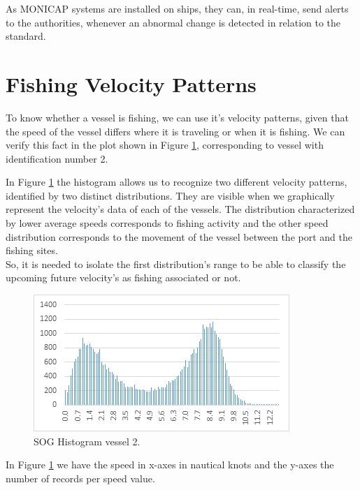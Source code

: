 As MONICAP systems are installed on ships, they can, in real-time, send alerts to the authorities, whenever an abnormal change is detected in relation to the standard.


\section{Fishing Velocity Patterns} %
\label{sub:fishing_velocity_patterns}
To know whether a vessel is fishing, we can use it’s velocity patterns, given that the speed of the vessel differs where it is traveling or when it is fishing. We can verify this fact in the plot shown in Figure \ref{fig:histogram_vessel2}, corresponding to vessel with identification number 2.

In Figure \ref{fig:histogram_vessel2} the histogram allows us to recognize two different velocity patterns, identified by two distinct distributions. They are visible when we graphically represent the velocity’s data of each of the vessels. The distribution characterized by lower average speeds corresponds to fishing activity and the other speed distribution corresponds to the movement of the vessel between the port and the fishing sites.\\
So, it is needed to isolate the first distribution’s range to be able to classify the upcoming future velocity’s as fishing associated or not.
 
\begin{figure}[H]
    \centering
    \includegraphics[width=0.8\linewidth]{Chapters/img/hist_vessel2.png}
    \caption{SOG Histogram vessel 2.}
    \label{fig:histogram_vessel2}
\end{figure}

In Figure \ref{fig:histogram_vessel2} we have the speed in x-axes in nautical knots and the y-axes the number of records per speed value.


